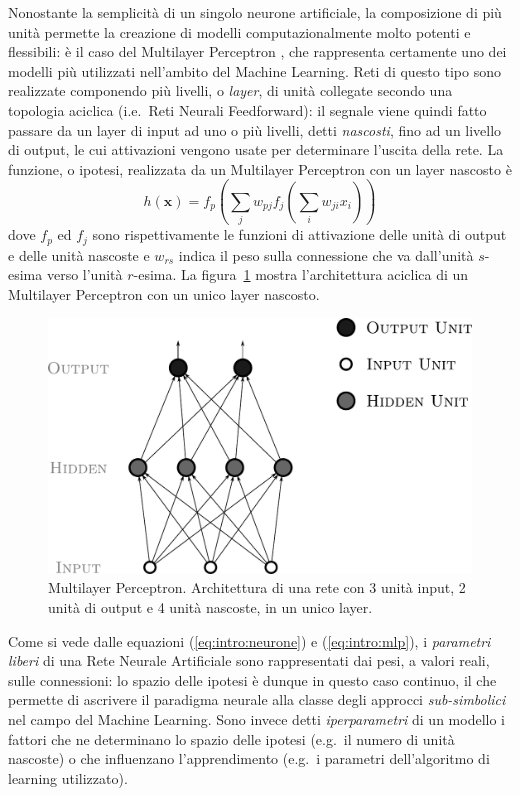 Nonostante la semplicità di un singolo neurone artificiale, la composizione di più unità permette la creazione di modelli computazionalmente molto potenti e flessibili: è il caso del Multilayer Perceptron \cite{Bishop:NNFPR,Haykin:NN}, che rappresenta certamente uno dei modelli più utilizzati nell'ambito del Machine Learning.
Reti di questo tipo sono realizzate componendo più livelli, o \emph{layer}, di unità collegate secondo una topologia aciclica (i.e.\ Reti Neurali Feedforward): il segnale viene quindi fatto passare da un layer di input ad uno o più livelli, detti \textit{nascosti}, fino ad un livello di output, le cui attivazioni vengono usate per determinare l'uscita della rete. La funzione, o ipotesi, realizzata da un Multilayer Perceptron con un layer nascosto è 
\begin{equation}\label{eq:intro:mlp}
h(\mathbf{x}) = f_{p} (  \sum_{j} w_{pj} f_{j} ( \sum_{i} w_{ji} x_{i} ) )
\end{equation}
dove $f_p$ ed $f_j$ sono rispettivamente le funzioni di attivazione delle unità di output e delle unità nascoste e $w_{rs}$ indica il peso sulla connessione che va dall'unità $s$-esima verso l'unità $r$-esima. La figura~\ref{fig:intro:mlp} mostra l'architettura aciclica di un Multilayer Perceptron con un unico layer nascosto.
\begin{figure}[tbp]
\centering
\includegraphics[width=0.7\columnwidth]{img/mlp}
\medskip
\caption[Multilayer Perceptron.]{Multilayer Perceptron. Architettura di una rete con 3 unità input, 2 unità di output e 4 unità nascoste, in un unico layer.}
\label{fig:intro:mlp}
\end{figure}

Come si vede dalle equazioni (\ref{eq:intro:neurone}) e (\ref{eq:intro:mlp}), i \emph{parametri liberi} di una Rete Neurale Artificiale sono rappresentati dai pesi, a valori reali, sulle connessioni: lo spazio delle ipotesi è dunque in questo caso continuo, il che permette di ascrivere il paradigma neurale alla classe degli approcci \emph{sub-simbolici} nel campo del Machine Learning. Sono invece detti \emph{iperparametri} di un modello i fattori che ne determinano lo spazio delle ipotesi (e.g.\ il numero di unità nascoste) o che influenzano l'apprendimento (e.g.\ i parametri dell'algoritmo di learning utilizzato).

